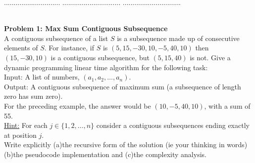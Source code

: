 \documentclass{article}
\begin{document}
\title{
}

\date{}


\newcommand{\DEF}[1]{{\em #1\/}}

\newcommand\chic{\chi_c}
\newcommand\C{\hbox{${\cal C}$}}
\newcommand{\RR}{\mbox{$\mathbb R$}}
\newcommand{\NN}{\mbox{$\mathbb N$}}
\newcommand{\ZZ}{\mbox{$\mathbb Z$}}
\newcommand{\eopf}{\raisebox{0.8ex}{\framebox{}}}
\newcommand{\dist}{\hbox{\rm d}}
\renewcommand\a{\alpha}
\renewcommand\b{\beta}
\renewcommand\c{\gamma}
\renewcommand\d{\delta}
\newcommand\D{\Delta}
\newcommand{\directedchi}{\mbox{$\vec{\chi}$}}
\newcommand{\directedE}{\mbox{$\vec{E}$}}
\newcommand{\directedG}{\mbox{$\vec{G}$}}
\newcommand{\directedK}{\mbox{$\vec{K}$}}

\newenvironment{proof}%
{\noindent{\bf Proof.}\ }%
{\hfill\eopf\par\bigskip}%




\noindent{\bf  } $.............................$
\noindent{\bf } $..............................$
\noindent{\bf }          $..............................$

\noindent
{}\\

\noindent
{\bf Problem 1:  Max Sum Contiguous Subsequence }\\
A contiguous subsequence of a list $S$ is a subsequence made up of consecutive elements of $S$. For
instance, if $ S$ is $(5, 15, -30, 10, -5, 40, 10)$ then $(15, -30, 10)$ is a contiguous subsequence, 
but $(5,15,40)$ is not. Give a dynamic programming  linear time algorithm for the following task:\\
Input: A list of numbers, $(a_1 , a_2 , \ldots , a_n)$.\\
Output: A contiguous subsequence of maximum sum (a subsequence of length zero
has sum zero).\\
For the preceding example, the answer would be $(10,-5,40,10)$, with a sum of 55.\\
\underline{Hint:} For each $j \in \{1 , 2, \ldots , n \}$ consider a contiguous subsequences ending exactly at position $j$.\\
Write explicitly (a)the recursive form of the solution (ie your thinking in words) (b)the pseudocode implementation and 
(c)the complexity analysis. \\
\end{document}
